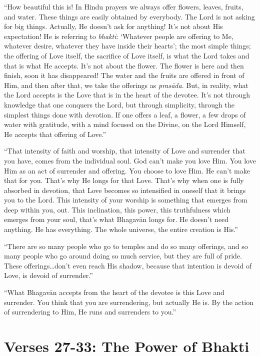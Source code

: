\enquote{How beautiful this is! In Hindu prayers we always offer flowers, leaves, fruits, and water. These things are easily obtained by everybody. The Lord is not asking for big things. Actually, He doesn’t ask for anything! It’s not about His expectation! He is referring to \textit{bhakti}: \enquote{Whatever people are offering to Me, whatever desire, whatever they have inside their hearts}; the most simple things; the offering of Love itself, the sacrifice of Love itself, is what the Lord takes and that is what He accepts. It’s not about the flower. The flower is here and then finish, soon it has disappeared! The water and the fruits are offered in front of Him, and then after that, we take the offerings as \textit{prasāda}. But, in reality, what the Lord accepts is the Love that is in the heart of the devotee. It’s not through knowledge that one conquers the Lord, but through simplicity, through the simplest things done with devotion. If one offers a leaf, a flower, a few drops of water with gratitude, with a mind focused on the Divine, on the Lord Himself, He accepts that offering of Love.}

\enquote{That intensity of faith and worship, that intensity of Love and surrender that you have, comes from the individual soul. God can’t make you love Him. You love Him as an act of surrender and offering. You choose to love Him. He can’t make that for you. That’s why He longs for that Love. That’s why when one is fully absorbed in devotion, that Love becomes so intensified in oneself that it brings you to the Lord. This intensity of your worship is something that emerges from deep within you, out. This inclination, this power, this truthfulness which emerges from your soul, that’s what Bhagavān longs for. He doesn’t need anything. He has everything. The whole universe, the entire creation is His.}

\enquote{There are so many people who go to temples and do so many offerings, and so many people who go around doing so much service, but they are full of pride. These offerings\ldots don’t even reach His shadow, because that intention is devoid of Love, is devoid of surrender.}

\enquote{What Bhagavān accepts from the heart of the devotee is this Love and surrender. You think that you are surrendering, but actually He is. By the action of surrendering to Him, He runs and surrenders to you.}

\section{Verses 27-33: The Power of Bhakti}\label{sec-verses-27-33-the-power-of-bhakti}


